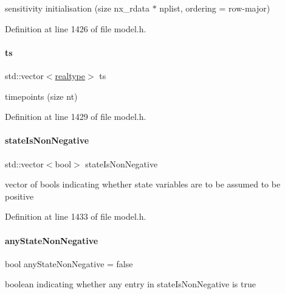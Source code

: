 sensitivity initialisation (size nx\+\_\+rdata $\ast$ nplist, ordering = row-\/major) 

Definition at line 1426 of file model.\+h.

\mbox{\label{classamici_1_1_model_aa7014a80e7b102f85a10e3b9a480e8e5}} 
\paragraph{\texorpdfstring{ts}{ts}}
{\footnotesize\ttfamily std\+::vector$<$\mbox{\hyperlink{namespaceamici_a1bdce28051d6a53868f7ccbf5f2c14a3}{realtype}}$>$ ts\hspace{0.3cm}{\ttfamily [protected]}}

timepoints (size nt) 

Definition at line 1429 of file model.\+h.

\mbox{\label{classamici_1_1_model_a30f9edd35aad3ccaba31f67331881da5}} 
\paragraph{\texorpdfstring{stateIsNonNegative}{stateIsNonNegative}}
{\footnotesize\ttfamily std\+::vector$<$bool$>$ state\+Is\+Non\+Negative\hspace{0.3cm}{\ttfamily [protected]}}

vector of bools indicating whether state variables are to be assumed to be positive 

Definition at line 1433 of file model.\+h.

\mbox{\label{classamici_1_1_model_a2b314d4bdf8555d609a69846b4ab0934}} 
\paragraph{\texorpdfstring{anyStateNonNegative}{anyStateNonNegative}}
{\footnotesize\ttfamily bool any\+State\+Non\+Negative = false\hspace{0.3cm}{\ttfamily [protected]}}

boolean indicating whether any entry in state\+Is\+Non\+Negative is {\ttfamily true} 

